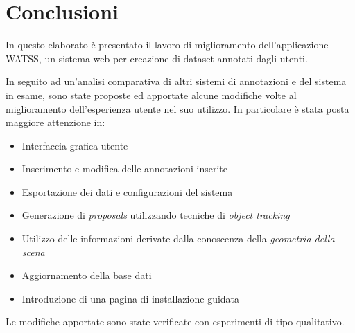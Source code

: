 \section{Conclusioni}

In questo elaborato è presentato il lavoro di miglioramento dell'applicazione WATSS, un sistema web per creazione di dataset annotati dagli utenti.

In seguito ad un'analisi comparativa di altri sistemi di annotazioni e del sistema in esame, sono state proposte ed apportate alcune modifiche volte al miglioramento dell'esperienza utente nel suo utilizzo. In particolare è stata posta maggiore attenzione in:
\begin{itemize}
\item Interfaccia grafica utente
\item Inserimento e modifica delle annotazioni inserite
\item Esportazione dei dati e configurazioni del sistema
\item Generazione di \emph{proposals} utilizzando tecniche di \emph{object tracking}
\item Utilizzo delle informazioni derivate dalla conoscenza della \emph{geometria della scena}
\item Aggiornamento della base dati
\item Introduzione di una pagina di installazione guidata
\end{itemize}

Le modifiche apportate sono state verificate con esperimenti di tipo qualitativo.